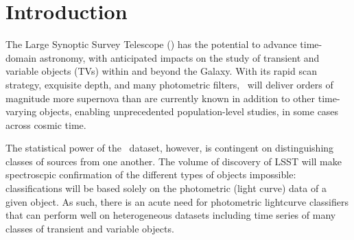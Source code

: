 \section{Introduction}
\label{sec:intro}


The Large Synoptic Survey Telescope (\lsst) has the potential to advance time-domain astronomy, with anticipated impacts on the study of transient and variable objects (TVs) within and beyond the Galaxy.
With its rapid scan strategy, exquisite depth, and many photometric filters, \lsst\ will deliver orders of magnitude more supernova than are currently known in addition to  other time-varying objects, enabling unprecedented population-level studies, in some cases across cosmic time.

The statistical power of the \lsst\ dataset, however, is contingent on distinguishing classes of sources from one another.
The volume of discovery of LSST will make spectroscpic confirmation of the different types of objects impossible: classifications will be based solely on the photometric (light curve) data of a given object.
As such, there is an acute need for photometric lightcurve classifiers that can perform well on heterogeneous datasets including time series of many classes of transient and variable objects.


